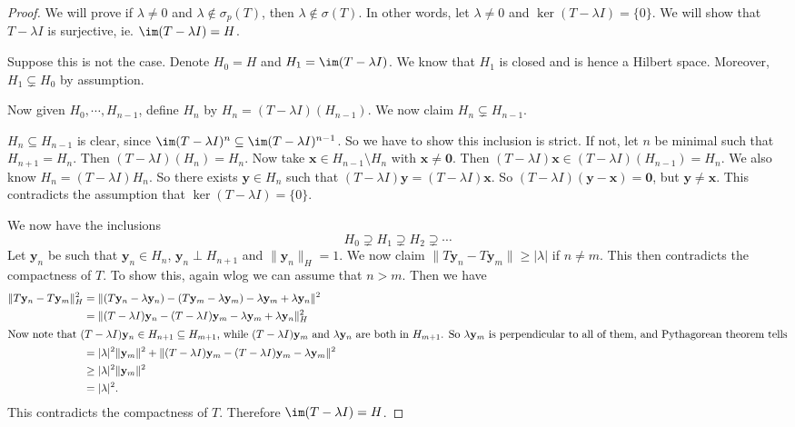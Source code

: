 \documentclass[a4paper]{article}
\begin{document}
\begin{proof}
  We will prove if $\lambda \not= 0$ and $\lambda \not\in \sigma_p(T)$, then $\lambda\not\in \sigma(T)$. In other words, let $\lambda \not= 0$ and $\ker (T - \lambda I) = \{0\}$. We will show that $T - \lambda I$ is surjective, ie. $\im (T - \lambda I) = H$.

  Suppose this is not the case. Denote $H_0 = H$ and $H_1 = \im (T - \lambda I)$. We know that $H_1$ is closed and is hence a Hilbert space. Moreover, $H_1 \subsetneq H_0$ by assumption.

  Now given $H_0, \cdots, H_{n - 1}$, define $H_n$ by $H_n = (T - \lambda I)(H_{n - 1})$. We now claim $H_n \subsetneq H_{n - 1}$.

  $H_n \subseteq H_{n - 1}$ is clear, since $\im (T - \lambda I)^n \subseteq \im (T - \lambda I)^{n - 1}$. So we have to show this inclusion is strict. If not, let $n$ be minimal such that $H_{n + 1} = H_n$. Then $(T - \lambda I)(H_n) = H_n$. Now take $\mathbf{x} \in H_{n - 1} \setminus H_n$ with $\mathbf{x}\not= \mathbf{0}$. Then $(T - \lambda I) \mathbf{x} \in (T - \lambda I)(H_{n - 1}) = H_n$. We also know $H_n = (T - \lambda I)H_n$. So there exists $\mathbf{y} \in H_n$ such that $(T - \lambda I)\mathbf{y} = (T - \lambda I)\mathbf{x}$. So $(T - \lambda I)(\mathbf{y} - \mathbf{x}) = \mathbf{0}$, but $\mathbf{y} \not= \mathbf{x}$. This contradicts the assumption that $\ker(T - \lambda I) = \{0\}$.

  We now have the inclusions
  \[
    H_0 \supsetneq H_1 \supsetneq H_2 \supsetneq \cdots
  \]
  Let $\mathbf{y}_n$ be such that $\mathbf{y}_n \in H_n$, $\mathbf{y}_n \perp H_{n + 1}$ and $\|\mathbf{y}_n\|_H = 1$. We now claim $\|T \mathbf{y}_n - T \mathbf{y}_m\| \geq |\lambda|$ if $n \not= m$. This then contradicts the compactness of $T$. To show this, again wlog we can assume that $n > m$. Then we have
  \begin{align*}
    \|T \mathbf{y}_n - T \mathbf{y}_m\|_H^2 &= \|(T \mathbf{y}_n - \lambda\mathbf{y}_n) - (T \mathbf{y}_m - \lambda\mathbf{y}_m) - \lambda\mathbf{y}_m + \lambda\mathbf{y}_n\|^2\\
    &= \|(T - \lambda I) \mathbf{y}_n - (T - \lambda I) \mathbf{y}_m - \lambda \mathbf{y}_m + \lambda \mathbf{y}_n\|^2_H\\
    \intertext{Now note that $(T - \lambda I)\mathbf{y} _n \in H_{n + 1}\subseteq H_{m + 1}$, while $(T - \lambda I)\mathbf{y}_m$ and $\lambda \mathbf{y}_n$ are both in $H_{m + 1}$. So $\lambda \mathbf{y}_m$ is perpendicular to all of them, and Pythagorean theorem tells}
    &= |\lambda|^2 \|\mathbf{y}_m\|^2 + \|(T - \lambda I)\mathbf{y}_m - (T - \lambda I)\mathbf{y}_m - \lambda \mathbf{y}_m\|^2\\
    &\geq |\lambda|^2 \|\mathbf{y}_m\|^2\\
    &= |\lambda|^2.
  \end{align*}
  This contradicts the compactness of $T$. Therefore $\im (T - \lambda I) = H$.
\end{proof}
\end{document}
